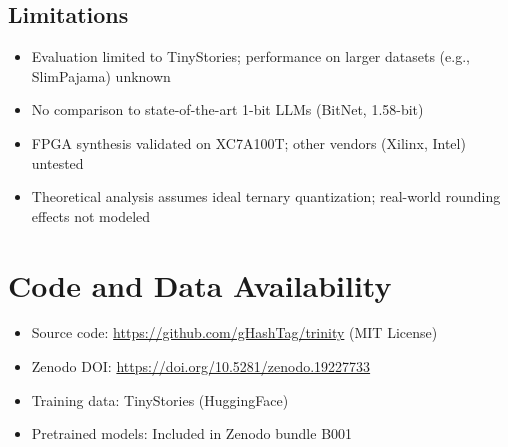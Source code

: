 \documentclass{article}
\newcommand{\doi}{10.5281/zenodo.19227733}
\newcommand{\github}{https://github.com/gHashTag/trinity}
\begin{document}
\subsection{Limitations}

\begin{itemize}
\item Evaluation limited to TinyStories; performance on larger datasets (e.g., SlimPajama) unknown
\item No comparison to state-of-the-art 1-bit LLMs (BitNet, 1.58-bit)
\item FPGA synthesis validated on XC7A100T; other vendors (Xilinx, Intel) untested
\item Theoretical analysis assumes ideal ternary quantization; real-world rounding effects not modeled
\end{itemize}

\section{Code and Data Availability}

\begin{itemize}
\item Source code: \url{\github} (MIT License)
\item Zenodo DOI: \url{https://doi.org/\doi}
\item Training data: TinyStories \cite{eldan2023tinystories} (HuggingFace)
\item Pretrained models: Included in Zenodo bundle B001
\end{itemize}



\end{document}
